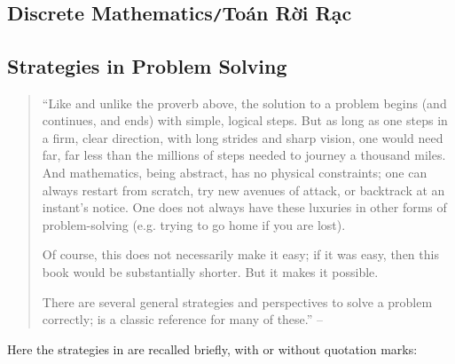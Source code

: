 \documentclass{article}
\numberwithin{equation}{section}
\begin{document}
\subsection{Discrete Mathematics\texttt{/}Toán Rời Rạc}

\subsection{Strategies in Problem Solving}
\begin{quotation}
	``Like and unlike the proverb above, the solution to a problem begins (and continues, and ends) with simple, logical steps. But as long as one steps in a firm, clear direction, with long strides and sharp vision, one would need far, far less than the millions of steps needed to journey a thousand miles. And mathematics, being abstract, has no physical constraints; one can always restart from scratch, try new avenues of attack, or backtrack at an instant's notice. One does not always have these luxuries in other forms of problem-solving (e.g. trying to go home if you are lost).
	
	Of course, this does not necessarily make it easy; if it was easy, then this book would be substantially shorter. But it makes it possible.
	
	There are several general strategies and perspectives to solve a problem correctly; \cite{Polya2014} is a classic reference for many of these.'' -- \cite[Chap. 1, p. 1]{Tao2006}
\end{quotation}
Here the strategies in \cite[Chap. 1, pp. 1--7]{Tao2006} are recalled briefly, with or without quotation marks:
\end{document}
